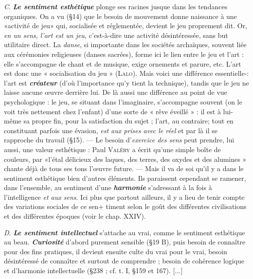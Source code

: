 {\it C}. \textbf{\textit {Le sentiment esthétique}} plonge ses racines jusque dans les tendances
organiques. On a vu (\S14) que le besoin de mouvement
donne naissance à une «activité de jeu» qui, socialisée et réglementée,
devient le jeu proprement dit. Or, {\it en un sens, l'art est un jeu,}
c'est-à-dire une activité désintéressée, sans but utilitaire direct. La
{\it danse}, si importante dans les sociétés archaïques, souvent liée aux
cérémonies religieuses (danses sacrées), forme ici le lien entre le jeu
et l’art : elle s’accompagne de chant et de musique, exige ornements
et parure, etc. L'art est donc une « socialisation du jeu » (\textsc{Lalo}). Mais
voici une différence essentielle-: l’art est \textbf{\textit {créateur}} (d’où l'importance
qu’y tient la technique), tandis que le jeu ne laisse aucune œuvre
derrière lui. De là aussi unc différence au point de vue psychologique :
le jeu, se situant dans l'imaginaire, s’accompagne souvent
(on le voit très nettement chez l’enfant) d’une sorte de « rêve éveillé » :
il est à lui-même sa propre fin, pour la satisfaction du sujet ; l’art, au
contraire; tout en constituant parfois une évasion, {\it est aux prises
avec le réel} et par là il se rapproche du travail (\S 15). — Le besoin
d'{\it exercice des sens} peut prendre, lui aussi, une valeur esthétique :
Paul \textsc{Valéry} a écrit qu’une simple boîte de couleurs, par «l’étal
délicieux des laques, des terres, des oxydes et des alumines » chante
déjà de tous ses tons l’œuvre future. — Mais il va de soi qu'il y a
dans le sentiment esthétique bien d’autres éléments. Ils paraissent
cependant se ramener, dans l’ensemble, au sentiment d’une \textbf{\textit {harmonie}}
s'adressant à la fois à l’intelligence {\it et aux sens}. Ici plus que partout
ailleurs, il y a lieu de tenir compte des variations sociales de ce sen+
timent selon le goût des différentes civilisations et des différentes
époques (voir le chap. XXIV).

{\it D}. \textbf{\textit {Le sentiment intellectuel}} s'attache au vrai, comme le sentiment
esthétique au beau. \textbf{\textit {Curiosité}} d’abord purement sensible (\S 19 B),
puis besoin de connaître pour des fins pratiques, il devient ensuite
culte du vrai pour le vrai, besoin désintéressé de connaître et surtout
de comprendre ; besoin de cohérence logique et d’harmonie
intellectuelle (\S 238 ; cf. t. I, \S 159 et 167).
 [...]
